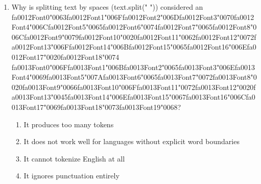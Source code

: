 \documentclass[12pt]{article}
\begin{document}
\begin{enumerate}[label=Q\arabic*.]
\begin{enumerate}[label=(\Alph*)]
    \item To assign probabilities to sentences
\end{enumerate}
\item Why is splitting text by spaces (text.split(" ")) considered an {\csname fa0012Font0\endcsname\char"0063}{\csname fa0012Font1\endcsname\char"006F}{\csname fa0012Font2\endcsname\char"006D}{\csname fa0012Font3\endcsname\char"0070}{\csname fa0012Font4\endcsname\char"006C}{\csname fa0012Font5\endcsname\char"0065}{\csname fa0012Font6\endcsname\char"0074}{\csname fa0012Font7\endcsname\char"0065}{\csname fa0012Font8\endcsname\char"006C}{\csname fa0012Font9\endcsname\char"0079}{\csname fa0012Font10\endcsname\char"0020}{\csname fa0012Font11\endcsname\char"0062}{\csname fa0012Font12\endcsname\char"0072}{\csname fa0012Font13\endcsname\char"006F}{\csname fa0012Font14\endcsname\char"006B}{\csname fa0012Font15\endcsname\char"0065}{\csname fa0012Font16\endcsname\char"006E}{\csname fa0012Font17\endcsname\char"0020}{\csname fa0012Font18\endcsname\char"0074} {\csname fa0013Font0\endcsname\char"006F}{\csname fa0013Font1\endcsname\char"006B}{\csname fa0013Font2\endcsname\char"0065}{\csname fa0013Font3\endcsname\char"006E}{\csname fa0013Font4\endcsname\char"0069}{\csname fa0013Font5\endcsname\char"007A}{\csname fa0013Font6\endcsname\char"0065}{\csname fa0013Font7\endcsname\char"0072}{\csname fa0013Font8\endcsname\char"0020}{\csname fa0013Font9\endcsname\char"0066}{\csname fa0013Font10\endcsname\char"006F}{\csname fa0013Font11\endcsname\char"0072}{\csname fa0013Font12\endcsname\char"0020}{\csname fa0013Font13\endcsname\char"0045}{\csname fa0013Font14\endcsname\char"006E}{\csname fa0013Font15\endcsname\char"0067}{\csname fa0013Font16\endcsname\char"006C}{\csname fa0013Font17\endcsname\char"0069}{\csname fa0013Font18\endcsname\char"0073}{\csname fa0013Font19\endcsname\char"0068}?
\begin{enumerate}[label=(\Alph*)]
    \item It produces too many tokens
    \item It does not work well for languages without explicit word boundaries
    \item It cannot tokenize English at all
    \item It ignores punctuation entirely
\end{enumerate}

\end{enumerate}
\end{document}
